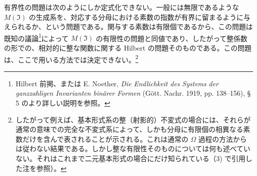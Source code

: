 有界性の問題は次のようにしか定式化できない。一般には無限であるような $M(\mathfrak{I})$ の生成系を、対応する分母における素数の指数が有界に留まるように与えられるか、という問題である。関与する素数は有限個であるから、この問題は既知の議論\footnote{Hilbert 前掲、または E. Noether, \emph{Die Endlichkeit des Systems der ganzzahligen Invarianten binärer Formen} (Gött. Nachr. 1919, pp. 138--156), \S\,5 のより詳しい説明を参照。}によって $M(\mathfrak{I})$ の有限性の問題と同値であり、したがって整係数の形での、相対的に整な関数に関する Hilbert の問題そのものである。この問題は、ここで用いる方法では決定できない。\footnote{したがって例えば、基本形式系の整（射影的）不変式の場合には、それらが通常の意味での完全な不変式系によって、しかも分母に有限個の相異なる素数だけを含んで表されることが示される。これは通常の $\Omega$ 過程の方法からは従わない結果である。しかし整な有限性そのものについては何も述べていない。それはこれまで二元基本形式の場合にだけ知られている（3) で引用した注を参照）。}

